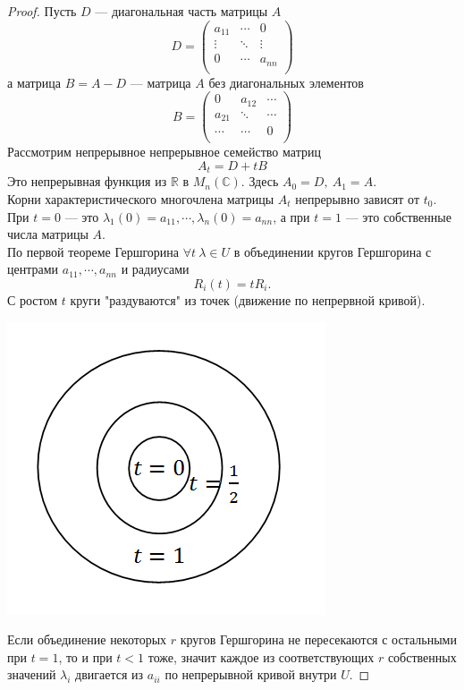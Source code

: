 \begin{proof}
Пусть $D$ --- диагональная часть матрицы $A$
\[D=\begin{pmatrix}
a_{11} & \cdots & 0 \\
\vdots & \ddots & \vdots \\
0 & \cdots & a_{nn} \\
\end{pmatrix}\]
а матрица $B=A-D$ --- матрица $A$ без диагональных элементов 
\[B=\begin{pmatrix}
0 & a_{12} & \cdots \\
a_{21} & \ddots & \cdots \\
\cdots & \cdots & 0 \\
\end{pmatrix}\]
Рассмотрим непрерывное непрерывное семейство матриц $$A_t=D+tB$$
Это непрерывная функция из $\mathbb{R}$ в $M_n(\mathbb{C})$. Здесь $A_0=D,~A_1=A$.\\
Корни характеристического многочлена матрицы $A_t$ непрерывно зависят от $t_0$. При $t=0$ --- это $\lambda_1(0)=a_{11},\cdots,\lambda_n(0)=a_{nn}$, а при $t=1$ --- это собственные числа матрицы $A$.\\
По первой теореме Гершгорина $\forall t~\lambda\in U$ в объединении кругов Гершгорина с центрами $a_{11},\cdots,a_{nn}$ и радиусами $$R_i(t)=tR_i.$$
С ростом $t$ круги "раздуваются" из точек (движение по непрервной кривой).
\begin{center}
    \includegraphics[scale=0.8]{l9_4.png}
\end{center}
Если объединение некоторых $r$ кругов Гершгорина не пересекаются с остальными при $t=1$, то и при $t<1$ тоже, значит каждое из соответствующих $r$ собственных значений $\lambda_i$ двигается из $a_{ii}$ по непрерывной кривой внутри $U.$
\end{proof}
